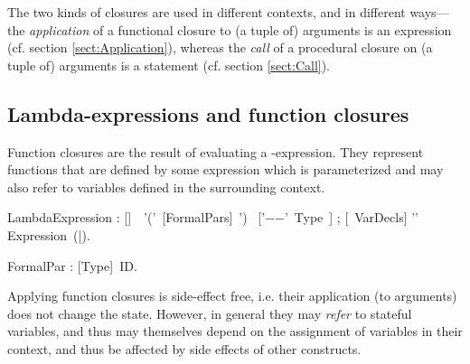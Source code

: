 The two kinds of closures are used in different contexts, and in
different ways---the {\em application} of a functional closure to (a
tuple of) arguments is an expression (cf. section
\ref{sect:Application}), whereas the {\em call} of a procedural
closure on (a tuple of) arguments is a statement (cf. section
\ref{sect:Call}).


\subsection{Lambda-expressions and function
  closures}\label{sect:LambdaClosures}


Function closures are the result of evaluating a \kwLambda-expression. They
represent functions that are defined by some expression which is
parameterized and may also refer to variables defined in the
surrounding context.


\bgr
LambdaExpression : [\kwConst]~\kwLambda~'('~[FormalPars]~') ~['$-$$-$\charMore'~Type~] ;
        [\kwVar ~VarDecls] '\charColon'
        Expression~(\kwEnd|\kwEndLambda).

FormalPar : [Type]~ID.
\egr

Applying function closures is side-effect free, i.e. their application
(to arguments) does not change the state. However, in general they may
{\em refer} to stateful variables, and thus may themselves depend on
the assignment of variables in their context, and thus be
affected by side effects of other constructs.


